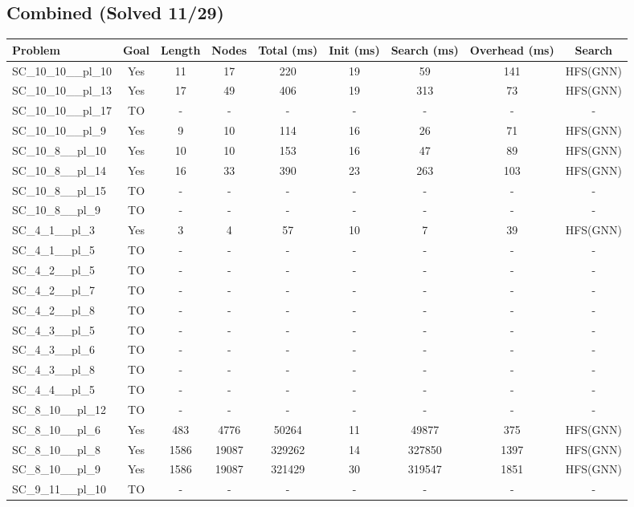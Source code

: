 \documentclass{article}
\begin{document}
\subsection*{Combined (Solved 11/29)}
\begin{tabular}{lcccccccc}
\toprule
Problem & Goal & Length & Nodes & Total (ms) & Init (ms) & Search (ms) & Overhead (ms) & Search \\
\midrule
SC\_10\_10\_\_pl\_10 & Yes & 11 & 17 & 220 & 19 & 59 & 141 & HFS(GNN) \\
SC\_10\_10\_\_pl\_13 & Yes & 17 & 49 & 406 & 19 & 313 & 73 & HFS(GNN) \\
SC\_10\_10\_\_pl\_17 & TO & - & - & - & - & - & - & - \\
SC\_10\_10\_\_pl\_9 & Yes & 9 & 10 & 114 & 16 & 26 & 71 & HFS(GNN) \\
SC\_10\_8\_\_pl\_10 & Yes & 10 & 10 & 153 & 16 & 47 & 89 & HFS(GNN) \\
SC\_10\_8\_\_pl\_14 & Yes & 16 & 33 & 390 & 23 & 263 & 103 & HFS(GNN) \\
SC\_10\_8\_\_pl\_15 & TO & - & - & - & - & - & - & - \\
SC\_10\_8\_\_pl\_9 & TO & - & - & - & - & - & - & - \\
SC\_4\_1\_\_pl\_3 & Yes & 3 & 4 & 57 & 10 & 7 & 39 & HFS(GNN) \\
SC\_4\_1\_\_pl\_5 & TO & - & - & - & - & - & - & - \\
SC\_4\_2\_\_pl\_5 & TO & - & - & - & - & - & - & - \\
SC\_4\_2\_\_pl\_7 & TO & - & - & - & - & - & - & - \\
SC\_4\_2\_\_pl\_8 & TO & - & - & - & - & - & - & - \\
SC\_4\_3\_\_pl\_5 & TO & - & - & - & - & - & - & - \\
SC\_4\_3\_\_pl\_6 & TO & - & - & - & - & - & - & - \\
SC\_4\_3\_\_pl\_8 & TO & - & - & - & - & - & - & - \\
SC\_4\_4\_\_pl\_5 & TO & - & - & - & - & - & - & - \\
SC\_8\_10\_\_pl\_12 & TO & - & - & - & - & - & - & - \\
SC\_8\_10\_\_pl\_6 & Yes & 483 & 4776 & 50264 & 11 & 49877 & 375 & HFS(GNN) \\
SC\_8\_10\_\_pl\_8 & Yes & 1586 & 19087 & 329262 & 14 & 327850 & 1397 & HFS(GNN) \\
SC\_8\_10\_\_pl\_9 & Yes & 1586 & 19087 & 321429 & 30 & 319547 & 1851 & HFS(GNN) \\
SC\_9\_11\_\_pl\_10 & TO & - & - & - & - & - & - & - \\

\end{tabular}
\end{document}
